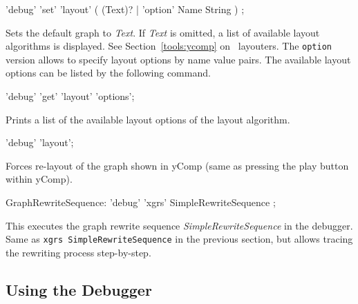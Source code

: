 \begin{rail}
  'debug' 'set' 'layout' ( (Text)? | 'option' Name String ) ;
\end{rail}
Sets the default graph  to \emph{Text}.
If \emph{Text} is omitted, a list of available layout algorithms is displayed.
See Section~\ref{tools:ycomp} on \yComp\ layouters.
The \texttt{option} version allows to specify layout options by name value pairs.
The available layout options can be listed by the following command.

\begin{rail}
  'debug' 'get' 'layout' 'options';
\end{rail}
Prints a list of the available layout options of the layout algorithm.

\begin{rail}
  'debug' 'layout';
\end{rail}
Forces re-layout of the graph shown in yComp (same as pressing the play button within yComp).

\begin{rail}
  GraphRewriteSequence: 'debug' 'xgrs' SimpleRewriteSequence ;
\end{rail}
This executes the graph rewrite sequence \emph{SimpleRewriteSequence} in the debugger.
Same as \texttt{xgrs SimpleRewriteSequence} in the previous section, but allows tracing the rewriting process step-by-step. 


\subsection{Using the Debugger}

